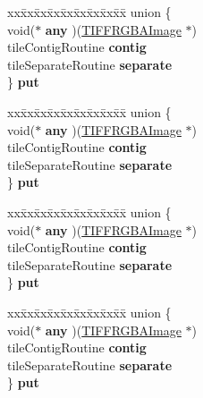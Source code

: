\begin{DoxyCompactItemize}
\begin{tabbing}
\end{tabbing}\item 
\mbox{\label{struct__TIFFRGBAImage_a2607746cda2be35ecff2981208c0422e}} 
\begin{tabbing}
xx\=xx\=xx\=xx\=xx\=xx\=xx\=xx\=xx\=\kill
union \{\\
\>void($\ast$ {\bfseries any} )(\hyperlink{struct__TIFFRGBAImage}{TIFFRGBAImage} $\ast$)\\
\>tileContigRoutine {\bfseries contig}\\
\>tileSeparateRoutine {\bfseries separate}\\
\} {\bfseries put}\\

\end{tabbing}\item 
\mbox{\label{struct__TIFFRGBAImage_a99eba9cebe62c3b159bd42a8e79b5fe8}} 
\begin{tabbing}
xx\=xx\=xx\=xx\=xx\=xx\=xx\=xx\=xx\=\kill
union \{\\
\>void($\ast$ {\bfseries any} )(\hyperlink{struct__TIFFRGBAImage}{TIFFRGBAImage} $\ast$)\\
\>tileContigRoutine {\bfseries contig}\\
\>tileSeparateRoutine {\bfseries separate}\\
\} {\bfseries put}\\

\end{tabbing}\item 
\mbox{\label{struct__TIFFRGBAImage_a04b857779f87260226aeb9da52199a2d}} 
\begin{tabbing}
xx\=xx\=xx\=xx\=xx\=xx\=xx\=xx\=xx\=\kill
union \{\\
\>void($\ast$ {\bfseries any} )(\hyperlink{struct__TIFFRGBAImage}{TIFFRGBAImage} $\ast$)\\
\>tileContigRoutine {\bfseries contig}\\
\>tileSeparateRoutine {\bfseries separate}\\
\} {\bfseries put}\\

\end{tabbing}\item 
\mbox{\label{struct__TIFFRGBAImage_ac7433c7f6782c2b5e91ecbb3e89f0bb6}} 
\begin{tabbing}
xx\=xx\=xx\=xx\=xx\=xx\=xx\=xx\=xx\=\kill
union \{\\
\>void($\ast$ {\bfseries any} )(\hyperlink{struct__TIFFRGBAImage}{TIFFRGBAImage} $\ast$)\\
\>tileContigRoutine {\bfseries contig}\\
\>tileSeparateRoutine {\bfseries separate}\\
\} {\bfseries put}\\


\end{tabbing}
\end{DoxyCompactItemize}
